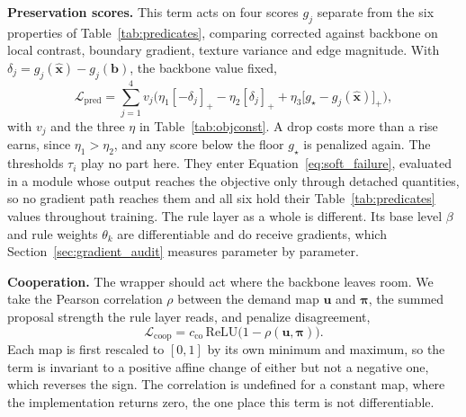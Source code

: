 \textbf{Preservation scores.} This term acts on four scores $g_j$ separate from the six properties of
Table~\ref{tab:predicates}, comparing corrected against backbone on local contrast, boundary
gradient, texture variance and edge magnitude. With
$\delta_j = g_j(\hat{\mathbf{x}}) - g_j(\mathbf{b})$, the backbone value fixed,
\begin{equation}
\mathcal{L}_{\mathrm{pred}} = \sum_{j=1}^{4} v_j \Big( \eta_{1}[-\delta_j]_+ - \eta_{2}[\delta_j]_+
 + \eta_{3}\big[g_\star - g_j(\hat{\mathbf{x}})\big]_+ \Big) ,
\label{eq:loss_pred}
\end{equation}
with $v_j$ and the three $\eta$ in Table~\ref{tab:objconst}. A drop costs more than a rise earns,
since $\eta_1 > \eta_2$, and any score below the floor $g_\star$ is penalized again. The thresholds $\tau_i$ play no part here. They enter
Equation~\eqref{eq:soft_failure}, evaluated in a module whose output reaches the objective only
through detached quantities, so no gradient path reaches them and all six hold their
Table~\ref{tab:predicates} values throughout training. The rule layer as a whole is different. Its
base level $\beta$ and rule weights $\theta_k$ are differentiable and do receive gradients, which
Section~\ref{sec:gradient_audit} measures parameter by parameter.

\textbf{Cooperation.} The wrapper should act where the backbone leaves room. We take the Pearson
correlation $\rho$ between the demand map $\mathbf{u}$ and $\boldsymbol{\pi}$, the summed proposal
strength the rule layer reads, and penalize disagreement,
\begin{equation}
\mathcal{L}_{\mathrm{coop}} = c_{\mathrm{co}}\,\mathrm{ReLU}\big(1 - \rho(\mathbf{u}, \boldsymbol{\pi})\big).
\label{eq:loss_coop}
\end{equation}
Each map is first rescaled to $[0,1]$ by its own minimum and maximum, so the term is invariant to a
positive affine change of either but not a negative one, which reverses the sign. The correlation is
undefined for a constant map, where the implementation returns zero, the one place this term is not
differentiable.

